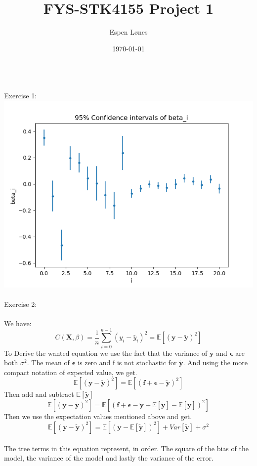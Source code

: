 \documentclass[12pt, letterpaper, twoside]{article}
\begin{document}
\title{FYS-STK4155 Project 1}
\author{Espen Lønes}
\date{\today}
\maketitle
\ \\
Exercise 1:\\
\includegraphics[scale=0.7]{"Confidence_beta.png"}\\
\newpage
\ \\
Exercise 2:\\
\ \\
We have:
$$
C(\mathbf{X}, \beta) = \frac{1}{n} \sum_{i=0}^{n-1} (y_i - \tilde{y_i})^2
= \mathbb{E}[(\mathbf{y} - \mathbf{\tilde{y}})^2]
$$
To Derive the wanted equation we use the fact that the variance of $\mathbf{y}$ and $\mathbf{\epsilon}$ are both $\sigma^2$. The mean of $\mathbf{\epsilon}$ is zero and f is not stochastic for $\mathbf{\tilde{y}}$. And using the more compact notation of expected value, we get.
$$
\mathbb{E}[(\mathbf{y} - \mathbf{\tilde{y}})^2]
=
\mathbb{E}[(\mathbf{f} + \mathbf{\epsilon} - \mathbf{\tilde{y}})^2]
$$
Then add and subtract $\mathbb{E}[\mathbf{\tilde{y}}]$
$$
\mathbb{E}[(\mathbf{y} - \mathbf{\tilde{y}})^2]
=
\mathbb{E}[(\mathbf{f} + \mathbf{\epsilon} - \mathbf{\tilde{y}} + \mathbb{E}[\mathbf{\tilde{y}}] - \mathbb{E}[\mathbf{\tilde{y}}])^2]
$$
Then we use the expectation values mentioned above and get.
$$
\mathbb{E}[(\mathbf{y} - \mathbf{\tilde{y}})^2]
=
\mathbb{E}[(\mathbf{y} - \mathbb{E}[\mathbf{\tilde{y}}])^2]
+ Var[\mathbf{\tilde{y}}]
+ \sigma^2
$$
\ \\
The tree terms in this equation represent, in order. The square of the bias of the model, the variance of the model and lastly the variance of the error.   
\end{document}
